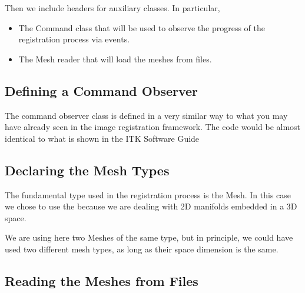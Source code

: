 \documentclass{InsightArticle}
\begin{document}
Then we include headers for auxiliary classes. In particular, 

\begin{itemize}
\item The Command class that will be used to observe the progress of the registration process via events.
\item The Mesh reader that will load the meshes from files.
\end{itemize}

\begin{center}

\end{center}

\subsection{Defining a Command Observer}

The command observer class is defined in a very similar way to what you may
have already seen in the image registration framework. The code would be almost
identical to what is shown in the ITK Software Guide \cite{ITKSoftwareGuideSecondEdition}

\begin{center}

\end{center}


\subsection{Declaring the Mesh Types}

The fundamental type used in the registration process is the Mesh. In this case
we chose to use the  because we are dealing with 2D
manifolds embedded in a 3D space.

\begin{center}

\end{center}

We are using here two Meshes of the same type, but in principle, we could have
used two different mesh types, as long as their space dimension is the same.

\subsection{Reading the Meshes from Files}
\end{document}
